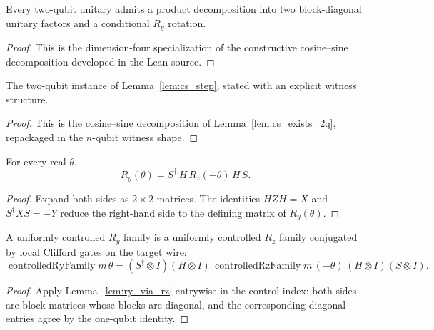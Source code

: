 \begin{lemma}
  \label{lem:cs_exists_2q}
  \leanok
  Every two-qubit unitary admits a product decomposition into two
  block-diagonal unitary factors and a conditional $R_y$ rotation.
\end{lemma}

\begin{proof}
  \leanok
  This is the dimension-four specialization of the constructive
  cosine--sine decomposition developed in the Lean source.
\end{proof}

\begin{lemma}
  \label{lem:cs_step_2q}
  \leanok
  The two-qubit instance of Lemma~\ref{lem:cs_step}, stated with an explicit
  witness structure.
\end{lemma}

\begin{proof}
  \leanok
  This is the cosine--sine decomposition of Lemma~\ref{lem:cs_exists_2q},
  repackaged in the $n$-qubit witness shape.
\end{proof}

\begin{lemma}[$R_y$ via $R_z$]
  \label{lem:ry_via_rz}
  \leanok
  For every real $\theta$,
  \[
    R_y(\theta) = S^\dagger\, H\, R_z(-\theta)\, H\, S.
  \]
\end{lemma}

\begin{proof}
  \leanok
  Expand both sides as $2 \times 2$ matrices.  The identities $HZH = X$ and
  $S^\dagger X S = -Y$ reduce the right-hand side to the defining matrix of
  $R_y(\theta)$.
\end{proof}

\begin{lemma}
  \label{lem:cry_via_crz}
  \leanok
  A uniformly controlled $R_y$ family is a uniformly controlled $R_z$ family
  conjugated by local Clifford gates on the target wire:
  \[
    \operatorname{controlledRyFamily} m\, \theta
      = (S^\dagger \otimes I)(H \otimes I)\,
        \operatorname{controlledRzFamily} m\, (-\theta)\,
        (H \otimes I)(S \otimes I).
  \]
\end{lemma}

\begin{proof}
  \leanok
  Apply Lemma~\ref{lem:ry_via_rz} entrywise in the control index: both sides
  are block matrices whose blocks are diagonal, and the corresponding diagonal
  entries agree by the one-qubit identity.
\end{proof}

